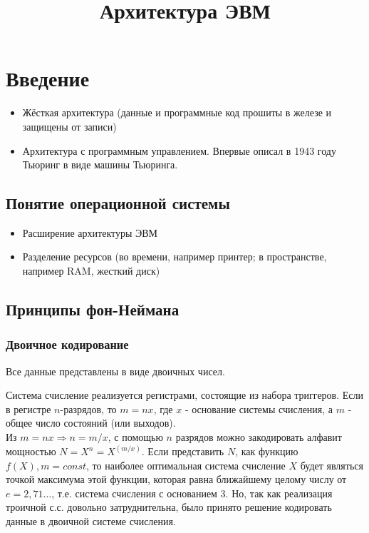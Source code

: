 \documentclass[]{article}
\title{Архитектура ЭВМ}
\author{}
\date{}
\begin{document}
\maketitle

\section{Введение}
	\begin{itemize}
		\item Жёсткая архитектура (данные и программные код прошиты в железе и защищены от записи)
		\item Архитектура с программным управлением. Впервые описал в 1943 году Тьюринг в виде машины Тьюринга.
	\end{itemize}
	
	\subsection{Понятие операционной системы}
		\begin{itemize}
			\item Расширение архитектуры ЭВМ
			\item Разделение ресурсов (во времени, например принтер; в пространстве, например RAM, жесткий диск)
		\end{itemize}
	\subsection{Принципы фон-Неймана}
		\subsubsection{Двоичное кодирование}
			Все данные представлены в виде двоичных чисел.
			
			Система счисление реализуется регистрами, состоящие из набора триггеров. Если в регистре $n$-разрядов, то $m=nx$, где $x$ - основание системы счисления, а $m$ - общее число состояний (или выходов).\\
			Из $m=nx \Rightarrow n = m/x$, с помощью $n$ разрядов можно закодировать алфавит мощностью $N = X^n = X^(m/x)$. Если представить $N$, как функцию $f(X), m=const$, то наиболее оптимальная система счисление $X$ будет являться точкой максимума этой функции, которая равна ближайшему целому числу от $e = 2,71\dots$, т.е. система счисления с основанием 3. Но, так как реализация троичной с.с. довольно затруднительна, было принято решение кодировать данные в двоичной системе счисления. 
			
\end{document}
